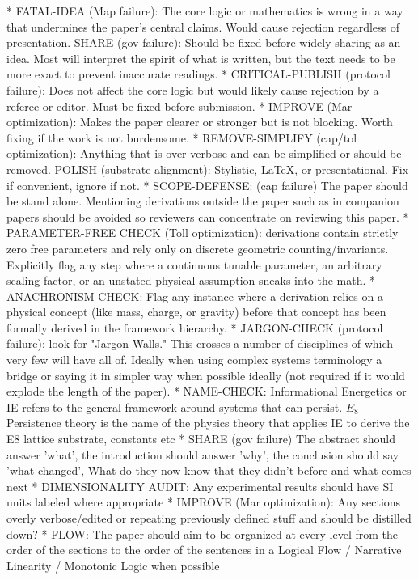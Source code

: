 * FATAL-IDEA (Map failure): The core logic or mathematics is wrong in a way that undermines the paper's central claims. Would cause rejection regardless of presentation.
SHARE (gov failure): Should be fixed before widely sharing as an idea.  Most will interpret the spirit of what is written, but the text needs to be more exact to prevent inaccurate readings.
* CRITICAL-PUBLISH (protocol failure): Does not affect the core logic but would likely cause rejection by a referee or editor. Must be fixed before submission.
* IMPROVE (Mar optimization): Makes the paper clearer or stronger but is not blocking. Worth fixing if the work is not burdensome.
* REMOVE-SIMPLIFY (cap/tol optimization): Anything that is over verbose and can be simplified or should be removed.
POLISH (substrate alignment): Stylistic, LaTeX, or presentational. Fix if convenient, ignore if not.
* SCOPE-DEFENSE: (cap failure) The paper should be stand alone.  Mentioning derivations outside the paper such as in companion papers should be avoided so reviewers can concentrate on reviewing this paper.
* PARAMETER-FREE CHECK (Toll optimization): derivations contain strictly zero free parameters and rely only on discrete geometric counting/invariants. Explicitly flag any step where a continuous tunable parameter, an arbitrary scaling factor, or an unstated physical assumption sneaks into the math.
* ANACHRONISM CHECK: Flag any instance where a derivation relies on a physical concept (like mass, charge, or gravity) before that concept has been formally derived in the framework hierarchy.
* JARGON-CHECK (protocol failure): look for "Jargon Walls." This crosses a number of disciplines of which very few will have all of.  Ideally when using complex systems terminology a bridge or saying it in simpler way when possible ideally (not required if it would explode the length of the paper).
* NAME-CHECK: Informational Energetics or IE refers to the general framework around systems that can persist.  $E_8$-Persistence theory is the name of the physics theory that applies IE to derive the E8 lattice substrate, constants etc
* SHARE (gov failure) The abstract should answer 'what', the introduction should answer 'why', the conclusion should say 'what changed', What do they now know that they didn't before and what comes next
* DIMENSIONALITY AUDIT: Any experimental results should have SI units labeled where appropriate
* IMPROVE (Mar optimization): Any sections overly verbose/edited or repeating previously defined stuff and should be distilled down?
* FLOW: The paper should aim to be organized at every level from the order of the sections to the order of the sentences in a Logical Flow / Narrative Linearity / Monotonic Logic when possible

